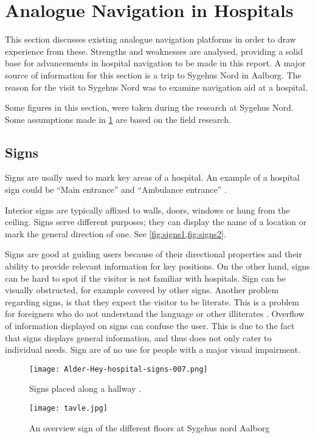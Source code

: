 \section{Analogue Navigation in Hospitals} %
\label{sec:anal_nav}

This section discusses existing analogue navigation platforms in order to draw experience from these. Strengths and weaknesses are analysed, providing a solid base for advancements in hospital navigation to be made in this report. A major source of information for this section is a trip to Sygehus Nord in Aalborg. The reason for the visit to Sygehus Nord was to examine navigation aid at a hospital.

Some figures in this section, were taken during the research at Sygehus Nord. Some assumptions made in \cref{sec:anal_nav} are based on the field research.

\subsection{Signs} \label{sub:sign}
Signs are usally used to mark key areas of a hospital. An example of a hospital sign could be \enquote{Main entrance} and \enquote{Ambulance entrance} \cite{signs_hospital,art_Osborne}.

Interior signs are typically affixed to walls, doors, windows or hung from the ceiling. Signs serve different purposes; they can display the name of a location or mark the general direction of one. See \cref{fig:signs1,fig:signs2}.

Signs are good at guiding users because of their directional properties and their ability to provide relevant information for key positions. On the other hand, signs can be hard to spot if the visitor is not familiar with hospitals. Sign can be visually obstructed, for example covered by other signs. Another problem regarding signs, is that they expect the visitor to be literate. This is a problem for foreigners who do not understand the language or other illiterates \cite{signs_reading}. Overflow of information displayed on signs can confuse the user. This is due to the fact that signs displays general information, and thus does not only cater to individual needs. Sign are of no use for people with a major visual impairment.


\begin{figure}
\centering
  \begin{minipage}{0.45\textwidth}
    \centering
    \texttt{[image: Alder-Hey-hospital-signs-007.png]}
    \caption{Signs placed along a hallway \cite{signs_hospital}.} \label{fig:signs1}
  \end{minipage}
  \hfill
  \begin{minipage}{0.45\textwidth}
    \centering
    \texttt{[image: tavle.jpg]}
    \caption{An overview sign of the different floors at Sygehus nord Aalborg} \label{fig:signs2}
  \end{minipage}
  \end{figure}

